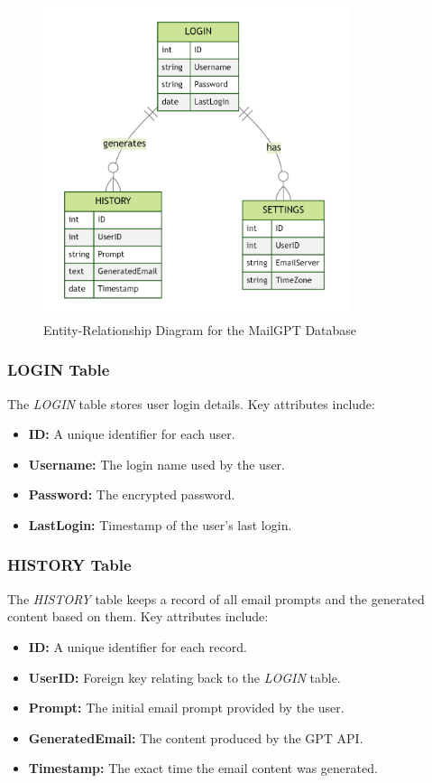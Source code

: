 \documentclass[12pt]{article}
\begin{document}
\begin{figure}[ht]
	\centering
	\includegraphics[width=0.8\textwidth]{ER_Diagram.png}
	\caption{Entity-Relationship Diagram for the MailGPT Database}
	\label{fig:er_diagram}
\end{figure}

\subsubsection{LOGIN Table}
The \textit{LOGIN} table stores user login details. Key attributes include:
\begin{itemize}
	\item \textbf{ID:} A unique identifier for each user.
	\item \textbf{Username:} The login name used by the user.
	\item \textbf{Password:} The encrypted password.
	\item \textbf{LastLogin:} Timestamp of the user's last login.
\end{itemize}

\subsubsection{HISTORY Table}
The \textit{HISTORY} table keeps a record of all email prompts and the generated content based on them. Key attributes include:
\begin{itemize}
	\item \textbf{ID:} A unique identifier for each record.
	\item \textbf{UserID:} Foreign key relating back to the \textit{LOGIN} table.
	\item \textbf{Prompt:} The initial email prompt provided by the user.
	\item \textbf{GeneratedEmail:} The content produced by the GPT API.
	\item \textbf{Timestamp:} The exact time the email content was generated.
\end{itemize}
\end{document}
